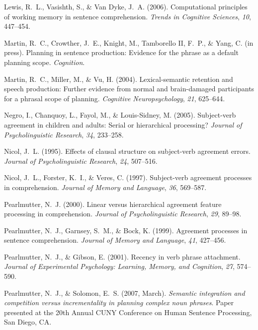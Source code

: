 \documentclass[12pt,titlepage]{article}
\newcommand{\itt}{\textit}  %
\begin{document}
\begin{description}
    \item Lewis, R.~L., Vasishth, S., \& Van Dyke, J.~A\@.  (2006).
    Computational principles of working memory in sentence comprehension.
    \itt{Trends in Cognitive Sciences}, \itt{10}, 447--454.
    
    \item Martin, R.~C., Crowther, J.~E., Knight, M., Tamborello II, F.~P.,
    \& Yang, C\@.  (in press).  Planning in sentence production: Evidence
    for the phrase as a default planning scope.  \itt{Cognition}.

    \item Martin, R.~C., Miller, M., \& Vu, H\@.  (2004).  Lexical-semantic
    retention and speech production: Further evidence from normal and
    brain-damaged participants for a phrasal scope of planning.
    \itt{Cognitive Neuropsychology}, \itt{21}, 625--644.
    
    \item Negro, I., Chanquoy, L., Fayol, M., \& Louis-Sidney, M\@.
    (2005).  Subject-verb agreement in children and adults: Serial or
    hierarchical processing?  \itt{Journal of Psycholinguistic Research},
    \itt{34}, 233--258.
    
    \item Nicol, J.~L\@.  (1995).  Effects of clausal structure on
    subject-verb agreement errors.  \itt{Journal of Psycholinguistic
    Research}, \itt{24}, 507--516.
    
    \item Nicol, J.~L., Forster, K.~I., \& Veres, C\@.  (1997).
    Subject-verb agreement processes in comprehension.  \itt{Journal of
    Memory and Language}, \itt{36}, 569--587.
    
    \item Pearlmutter, N.~J\@.  (2000).  Linear versus hierarchical
    agreement feature processing in comprehension.  \itt{Journal of
    Psycholinguistic Research}, \itt{29}, 89--98.
    
    \item Pearlmutter, N.~J., Garnsey, S.~M., \& Bock, K\@.  (1999).
    Agreement processes in sentence comprehension.  \itt{Journal of Memory
    and Language}, \itt{41}, 427--456.
    
    \item Pearlmutter, N.~J., \& Gibson, E\@.  (2001).  Recency in verb
    phrase attachment.  \itt{Journal of Experimental Psychology: Learning,
    Memory, and Cognition}, \itt{27}, 574--590.
    
    \item Pearlmutter, N.~J., \& Solomon, E.~S\@.  (2007, March).
    \itt{Semantic integration and competition versus incrementality in
    planning complex noun phrases}.  Paper presented at the 20th Annual
    CUNY Conference on Human Sentence Processing, San Diego, CA.
    

\end{description}
\end{document}

